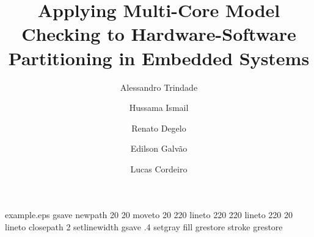 %
%
%
%
%
\begin{filecontents*}{example.eps}
gsave
newpath
  20 20 moveto
  20 220 lineto
  220 220 lineto
  220 20 lineto
closepath
2 setlinewidth
gsave
  .4 setgray fill
grestore
stroke
grestore
\end{filecontents*}
%
\RequirePackage{fix-cm}
%
\documentclass[twocolumn]{svjour3}       %
%
\smartqed  %
%

\usepackage{booktabs}
\usepackage{amsmath}
\usepackage[utf8]{inputenc} 
\usepackage{graphicx}
\usepackage{listings}
\usepackage{color}
%
%
%
%
%


\title{Applying Multi-Core Model Checking to Hardware-Software Partitioning in Embedded Systems}
\author{Alessandro Trindade\and Hussama Ismail\and Renato Degelo\and Edilson Galv\~ao\and Lucas Cordeiro}
\maketitle


